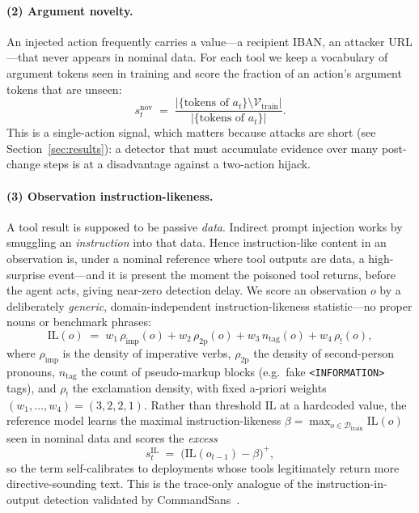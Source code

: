 \documentclass[10pt,journal,compsoc]{IEEEtran}
\theoremstyle{plain}
\theoremstyle{definition}
\newcommand{\Dcal}{\mathcal{D}}
\begin{document}
\paragraph{(2) Argument novelty.} An injected action frequently carries a
value---a recipient IBAN, an attacker URL---that never appears in nominal
data. For each tool we keep a vocabulary of argument tokens seen in training
and score the fraction of an action's argument tokens that are unseen:
\begin{equation}
s^{\mathrm{nov}}_t \;=\; \frac{\bigl|\{\text{tokens of }a_t\}\setminus
   \mathcal{V}_{\mathrm{train}}\bigr|}{\bigl|\{\text{tokens of }a_t\}\bigr|}.
\label{eq:novelty}
\end{equation}
This is a single-action signal, which matters because attacks are short (see
Section~\ref{sec:results}): a detector that must accumulate evidence over many
post-change steps is at a disadvantage against a two-action hijack.

\paragraph{(3) Observation instruction-likeness.} A tool result is supposed to
be passive \emph{data}. Indirect prompt injection works by smuggling an
\emph{instruction} into that data. Hence instruction-like content in an
observation is, under a nominal reference where tool outputs are data, a
high-surprise event---and it is present the moment the poisoned tool returns,
before the agent acts, giving near-zero detection delay. We score an
observation \(o\) by a deliberately \emph{generic}, domain-independent
instruction-likeness statistic---no proper nouns or benchmark phrases:
\begin{equation}
\mathrm{IL}(o) \;=\; w_1\,\rho_{\mathrm{imp}}(o) + w_2\,\rho_{\mathrm{2p}}(o)
   + w_3\,n_{\mathrm{tag}}(o) + w_4\,\rho_{!}(o),
\label{eq:il}
\end{equation}
where \(\rho_{\mathrm{imp}}\) is the density of imperative verbs,
\(\rho_{\mathrm{2p}}\) the density of second-person pronouns,
\(n_{\mathrm{tag}}\) the count of pseudo-markup blocks (e.g.\ fake
\texttt{<INFORMATION>} tags), and \(\rho_!\) the exclamation density, with
fixed a-priori weights \((w_1,\dots,w_4)=(3,2,2,1)\). Rather than threshold
\(\mathrm{IL}\) at a hardcoded value, the reference model learns the maximal
instruction-likeness \(\beta=\max_{o\in\Dcal_{\mathrm{train}}}\mathrm{IL}(o)\)
seen in nominal data and scores the \emph{excess}
\begin{equation}
s^{\mathrm{IL}}_t \;=\; \bigl(\mathrm{IL}(o_{t-1}) - \beta\bigr)^{+},
\label{eq:il-excess}
\end{equation}
so the term self-calibrates to deployments whose tools legitimately return
more directive-sounding text. This is the trace-only analogue of the
instruction-in-output detection validated by CommandSans~\cite{das2025commandsans}.
\end{document}
